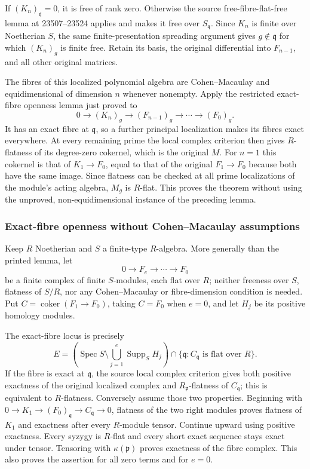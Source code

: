 If \((K_n)_{\mathfrak q}=0\), it is free of rank zero. Otherwise the source free-fibre-flat-free lemma at 23507--23524 applies and makes it free over \(S_{\mathfrak q}\). Since \(K_n\) is finite over Noetherian \(S\), the same finite-presentation spreading argument gives \(g\notin\mathfrak q\) for which \((K_n)_g\) is finite free. Retain its basis, the original differential into \(F_{n-1}\), and all other original matrices.

The fibres of this localized polynomial algebra are Cohen--Macaulay and equidimensional of dimension \(n\) whenever nonempty. Apply the restricted exact-fibre openness lemma just proved to \[
0\longrightarrow (K_n)_g\longrightarrow (F_{n-1})_g
\longrightarrow\cdots\longrightarrow(F_0)_g.
\] It has an exact fibre at \(\mathfrak q\), so a further principal localization makes its fibres exact everywhere. At every remaining prime the local complex criterion then gives \(R\)-flatness of its degree-zero cokernel, which is the original \(M\). For \(n=1\) this cokernel is that of \(K_1\to F_0\), equal to that of the original \(F_1\to F_0\) because both have the same image. Since flatness can be checked at all prime localizations of the module's acting algebra, \(M_g\) is \(R\)-flat. This proves the theorem without using the unproved, non-equidimensional instance of the preceding lemma.

\subsubsection{Exact-fibre openness without Cohen--Macaulay assumptions}\label{algebra-proof-039-exact-fibre-openness-without-cohenmacaulay-assumptions}

Keep \(R\) Noetherian and \(S\) a finite-type \(R\)-algebra. More generally than the printed lemma, let \[
0\longrightarrow F_e\longrightarrow\cdots\longrightarrow F_0
\] be a finite complex of finite \(S\)-modules, each flat over \(R\); neither freeness over \(S\), flatness of \(S/R\), nor any Cohen--Macaulay or fibre-dimension condition is needed. Put \(C=\operatorname{coker}(F_1\to F_0)\), taking \(C=F_0\) when \(e=0\), and let \(H_j\) be its positive homology modules.

The exact-fibre locus is precisely \[
E=
\left(\operatorname{Spec}S\setminus\bigcup_{j=1}^e\operatorname{Supp}_S H_j\right)
\cap
\{\mathfrak q:C_{\mathfrak q}\text{ is flat over }R\}.
\] If the fibre is exact at \(\mathfrak q\), the source local complex criterion gives both positive exactness of the original localized complex and \(R_{\mathfrak p}\)-flatness of \(C_{\mathfrak q}\); this is equivalent to \(R\)-flatness. Conversely assume those two properties. Beginning with \(0\to K_1\to(F_0)_{\mathfrak q}\to C_{\mathfrak q}\to0\), flatness of the two right modules proves flatness of \(K_1\) and exactness after every \(R\)-module tensor. Continue upward using positive exactness. Every syzygy is \(R\)-flat and every short exact sequence stays exact under tensor. Tensoring with \(\kappa(\mathfrak p)\) proves exactness of the fibre complex. This also proves the assertion for all zero terms and for \(e=0\).

